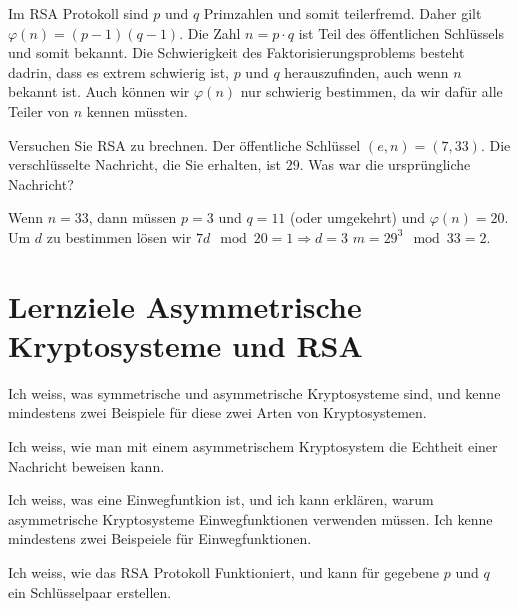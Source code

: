Im RSA Protokoll sind $p$ und $q$ Primzahlen und somit teilerfremd. Daher gilt $\varphi(n) = (p-1)(q-1)$. Die Zahl $n=p\cdot q$ ist Teil des öffentlichen Schlüssels und somit bekannt. Die Schwierigkeit des Faktorisierungsproblems besteht dadrin, dass es extrem schwierig ist, $p$ und $q$ herauszufinden, auch wenn $n$ bekannt ist. Auch können wir $\varphi(n)$ nur schwierig bestimmen, da wir dafür alle Teiler von $n$ kennen müssten.

\begin{myexercise}
	Versuchen Sie RSA zu brechnen. Der öffentliche Schlüssel $(e, n) = (7, 33)$. Die verschlüsselte Nachricht, die Sie erhalten, ist $29$. Was war die ursprüngliche Nachricht?
	\begin{myanswer}
		Wenn $n=33$, dann müssen $p=3$ und $q=11$ (oder umgekehrt) und $\varphi(n)= 20$. Um $d$ zu bestimmen lösen wir $7d\mod 20 = 1 \Rightarrow d = 3$ $m=29^{3} \mod 33 = 2$.
	\end{myanswer}
\end{myexercise}

\section{Lernziele Asymmetrische Kryptosysteme und RSA}

\begin{todolist}
  \item Ich weiss, was symmetrische und asymmetrische Kryptosysteme sind, und kenne mindestens zwei Beispiele für diese zwei Arten von Kryptosystemen.
  \item Ich weiss, wie man mit einem asymmetrischem Kryptosystem die Echtheit einer Nachricht beweisen kann.
  \item Ich weiss, was eine Einwegfuntkion ist, und ich kann erklären, warum asymmetrische Kryptosysteme Einwegfunktionen verwenden müssen. Ich kenne mindestens zwei Beispeiele für Einwegfunktionen.
  \item Ich weiss, wie das RSA Protokoll Funktioniert, und kann für gegebene $p$ und $q$ ein Schlüsselpaar erstellen.
\end{todolist}
